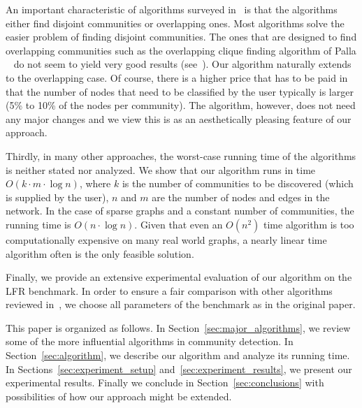 An important characteristic of algorithms surveyed in~\cite{LF09} 
is that the algorithms either find disjoint communities or overlapping 
ones. Most algorithms solve the easier problem of finding disjoint communities. 
The ones that are designed to find overlapping communities such as the overlapping clique finding 
algorithm of Palla \etal~\cite{PDFV05} do not seem to yield very good results (see~\cite{LF09}).
Our algorithm naturally extends to the overlapping case. Of course, there is a higher 
price that has to be paid in that the number of nodes that need to be classified by the user 
typically is larger (5\% to 10\% of the nodes per community). The algorithm, however,
does not need any major changes and we view this is as an aesthetically pleasing 
feature of our approach. 

Thirdly, in many other approaches, the worst-case running time of the algorithms 
is neither stated nor analyzed. We show that our algorithm runs in time $O(k \cdot m \cdot \log n)$, 
where $k$ is the number of communities to be discovered (which is supplied by the user), 
$n$ and $m$ are the number of nodes and edges in the network. In the case of sparse graphs 
and a constant number of communities, the running time is $O(n \cdot \log n)$. Given that even 
an $O(n^2)$ time algorithm is too computationally expensive on many real world graphs, 
a nearly linear time algorithm often is the only feasible solution.   

Finally, we provide an extensive experimental evaluation of our algorithm on the 
LFR benchmark. In order to ensure a fair comparison with other algorithms 
reviewed in~\cite{LF09}, we choose all parameters of the benchmark as in the original paper.


This paper is organized as follows. In Section~\ref{sec:major_algorithms}, we review some 
of the more influential algorithms in community detection. In Section~\ref{sec:algorithm}, we 
describe our algorithm and analyze its running time. In Sections~\ref{sec:experiment_setup} 
and~\ref{sec:experiment_results}, we present our experimental results. Finally we conclude 
in Section~\ref{sec:conclusions} with possibilities of how our approach might be extended. 



